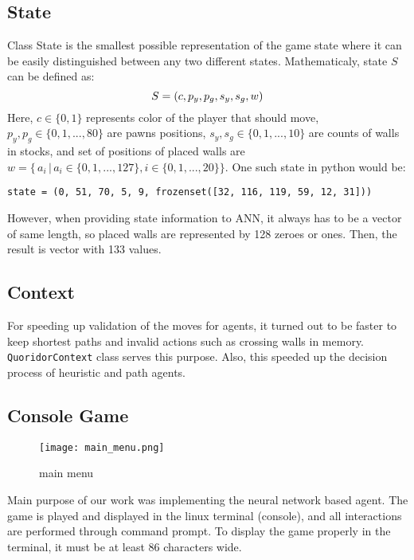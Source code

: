\subsection{State}
Class State is the smallest possible representation of the game state where
it can be easily distinguished between any two different states. Mathematicaly,
state $S$ can be defined as:
\begin{equation}
  \label{eqn:state_def}
  S = (c, p_y, p_g, s_y, s_g, w)
  \vspace*{-0.20cm}
\end{equation}
Here, $c\in\{0, 1\} $ represents color of the player that should move,
$p_y,p_g\in\{0,1,...,80\}$ are pawns positions,
${s_y},{s_g} \in \{0, 1, ..., 10\}$ are counts of walls in stocks,
and set of positions of placed walls are
${w = \{\,a_i\,|\,a_i \in \{0, 1, ..., 127\}, i \in \{0, 1, ..., 20\} \}}$.
One such state in python would be:
\begin{lstlisting}
state = (0, 51, 70, 5, 9, frozenset([32, 116, 119, 59, 12, 31]))
\end{lstlisting}

However, when providing state information to ANN, it always has to be a vector
of same length, so placed walls are represented by 128 zeroes or ones. Then,
the result is vector with 133 values.

\subsection{Context}
For speeding up validation of the moves for agents, it turned out to be faster
to keep shortest paths and invalid actions such as crossing walls in memory.
{\lstinline{QuoridorContext}} class serves this purpose.
Also, this speeded up the decision process of heuristic and path agents.

\subsection{Console Game}
\begin{wrapfigure}{r}{0.5\textwidth}
  \vspace*{-2.05cm}
  \centering
  \texttt{[image: main\_menu.png]}
  \vspace*{-0.35cm}
  \caption{main menu}
  \label{fig:main_menu}
  \vspace*{-0.70cm}
\end{wrapfigure}

Main purpose of our work was implementing the neural network based agent.
The game is played and displayed in the linux terminal
(console), and all interactions are performed through command prompt.
To display the game properly in the terminal, it must be at least 86 characters
wide.

